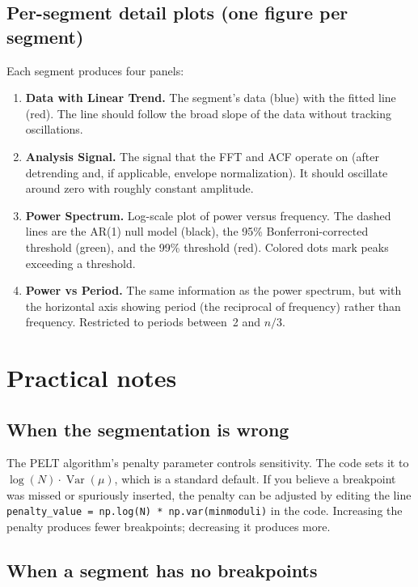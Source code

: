\documentclass[11pt]{article}
\newcommand{\code}[1]{\texttt{#1}}
\begin{document}
\subsection{Per-segment detail plots (one figure per segment)}

Each segment produces four panels:

\begin{enumerate}
\item \textbf{Data with Linear Trend.}  The segment's data (blue) with the
  fitted line (red).  The line should follow the broad slope of the data
  without tracking oscillations.

\item \textbf{Analysis Signal.}  The signal that the FFT and ACF operate
  on (after detrending and, if applicable, envelope normalization).  It
  should oscillate around zero with roughly constant amplitude.

\item \textbf{Power Spectrum.}  Log-scale plot of power versus frequency.
  The dashed lines are the AR(1) null model (black), the 95\%
  Bonferroni-corrected threshold (green), and the 99\% threshold (red).
  Colored dots mark peaks exceeding a threshold.

\item \textbf{Power vs Period.}  The same information as the power
  spectrum, but with the horizontal axis showing period (the reciprocal of
  frequency) rather than frequency.  Restricted to periods between~2 and
  $n/3$.
\end{enumerate}

\section{Practical notes}

\subsection*{When the segmentation is wrong}

The PELT algorithm's penalty parameter controls sensitivity.  The code
sets it to $\log(N) \cdot \operatorname{Var}(\mu)$, which is a standard
default.  If you believe a breakpoint was missed or spuriously inserted,
the penalty can be adjusted by editing the line
\code{penalty\_value = np.log(N) * np.var(minmoduli)} in the code.
Increasing the penalty produces fewer breakpoints; decreasing it produces
more.

\subsection*{When a segment has no breakpoints}
\end{document}
